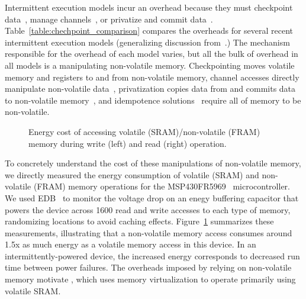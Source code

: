 Intermittent execution models incur an overhead because they must checkpoint
data~\cite{dino,ratchet,quickrecall,mementos}, manage channels~\cite{chain}, or
privatize and commit data~\cite{alpaca}.
%
Table~\ref{table:chechpoint_comparison} compares the overheads for several
recent intermittent execution models (generalizing discussion from~\cite[Sec.
2.4]{alpaca}.)  The mechanism responsible for the overhead of each model
varies, but all the bulk of overhead in all models is a manipulating
non-volatile memory.  Checkpointing moves volatile memory and registers to and
from non-volatile memory, channel accesses directly manipulate non-volatile
data~\cite{chain}, privatization copies data from and commits data to
non-volatile memory~\cite{alpaca}, and idempotence solutions~\cite{ratchet}
require all of memory to be non-volatile.  

\begin{figure}
	\centering
	\caption{Energy cost of accessing volatile (SRAM)/non-volatile (FRAM) memory during write (left) and read (right) operation.}
	\label{fig:framEnergy}
\end{figure}

To concretely understand the cost of these manipulations of non-volatile
memory, we directly measured the energy consumption of volatile (SRAM) and
non-volatile (FRAM) memory operations for the
MSP430FR5969~\cite{msp430datasheet} microcontroller. We used EDB~\cite{edb} to
monitor the voltage drop on an enegy buffering capacitor that powers the device
across 1600 read and write accesses to each type of memory, randomizing
locations to avoid caching effects.  Figure~\ref{fig:framEnergy} summarizes
these measurements, illustrating that a non-volatile memory access consumes
around 1.5x as much energy as a volatile memory access in this device.  In an
intermittently-powered device, the increased energy corresponds to decreased
run time between power failures.  The overheads imposed by relying on
non-volatile memory motivate \sys, which uses memory virtualization to operate
primarily using volatile SRAM.


